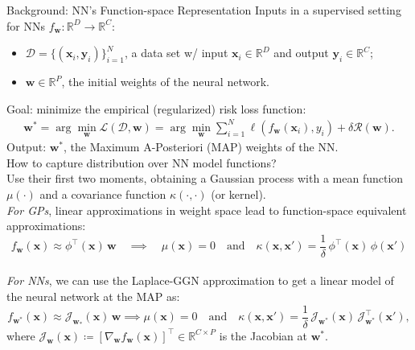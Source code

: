 \documentclass[final,12pt]{beamer}
\newcommand{\mbf}[1]{\mathbf{#1}}
\newcommand{\dataset}{\ensuremath{\mathcal{D}}}
\newcommand{\inputDomain}{\ensuremath{\mathbb{R}^{D}}}
\newcommand{\outputDomain}{\ensuremath{\mathbb{R}^{C}}}
\newcommand{\weights}{\ensuremath{\mathbf{w}}}
\newcommand{\T}{\top}
\newcommand{\vx}{\mbf{x}}
\newcommand{\vy}{\mbf{y}}
\newcommand{\vw}{\mbf{w}}
\newcommand{\Jac}[2]{\mathcal{J}_{#1}(#2)}
\newcommand{\JacT}[2]{\mathcal{J}_{#1}^\top(#2)}
\newcommand{\R}{\mathbb{R}}
\newlength{\colwidth}
\begin{document}
\begin{frame}[t]
\begin{columns}[t]
\begin{column}{\colwidth}
  \begin{block}{Background: NN's Function-space Representation}
  \alert{Inputs} in a supervised setting for NNs $f_\mathbf{w}: \inputDomain \to \outputDomain$:\
  \begin{itemize}
  \item $\dataset = \{(\vx_{i} , \vy_{i})\}_{i=1}^{N}$, a data set w/ input $\vx_i \in \inputDomain$ and output $\vy_i \in \outputDomain$;
  \item $\weights \in \R^{P}$, the initial weights of the neural network.
  \end{itemize}
\alert{Goal: }
  minimize the empirical (regularized) risk loss function:
\begin{align} 
  \weights^{*} =  \arg \min_{\weights} \mathcal{L}(\dataset,\weights) \nonumber
     = \arg \min_{\weights} \textstyle\sum_{i=1}^{N} \ell(f_\weights(\mathbf{x}_{i}), y_i) + \delta \mathcal{R}(\weights).
 \end{align}
\alert{Output:} $\weights^*$, the Maximum A-Posteriori (MAP) weights of the NN.\\[0.5cm]

\alert{How to capture distribution over NN model functions?}	\\
Use their first two moments, obtaining a Gaussian process with a \alert{mean function $\mu(\cdot)$} and a \alert{covariance function $\kappa(\cdot,\cdot)$} (or kernel). \\
{\it For GPs}, linear approximations in weight space lead to function-space equivalent approximations:
\begin{equation*}
	f_\weights(\vx) \approx 
\phi^\top\!(\vx) \, \vw \quad\implies\quad \mu(\vx) = 0 \quad \text{and} \quad \kappa(\vx, \vx') = \frac{1}{\delta} \, \phi^\T\!(\vx) \, \phi(\vx')
\end{equation*}\\
{\it For NNs}, we can use the Laplace-GGN approximation to get a linear model of the neural network at the MAP as:
\begin{equation*}
	f_{\weights^*}(\vx) \approx \Jac{\weights_*}{\vx} \, \weights \implies   \mu(\vx) =  0 \quad \text{and} \quad
  \kappa(\vx, \vx')
  = \frac{1}{\delta} \, \Jac{\weights^*}{\vx} \, \JacT{\weights^*}{\vx'}, 
\end{equation*}
where $\Jac{\weights}{\vx} \coloneqq \left[ \nabla_\weights f_\weights(\vx)\right]^\top \in \R^{C \times P}$ is the Jacobian at $\weights^*$.
\end{block}
\end{column}


\end{columns}
\end{frame}
\end{document}
